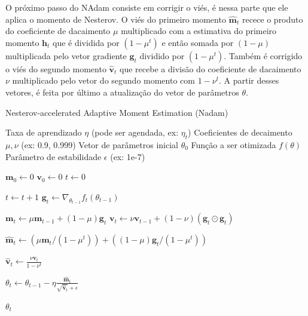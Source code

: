 O próximo passo do NAdam consiste em corrigir o viés, é nessa parte que ele aplica o momento de Nesterov. O viés do primeiro momento $\mathbf{\hat{m}}_t$ recece o produto do coeficiente de dacaimento $\mu$ multiplicado com a estimativa do primeiro momento $\mathbf{h}_t$ que é dividida por $(1 - \mu^t)$ e então somada por $(1 - \mu)$ multiplicada pelo vetor gradiente $\mathbf{g}_t$ dividido por $(1 - \mu^t)$. Também é corrigido o viés do segundo momento $\mathbf{\hat{v}}_t$ que recebe a divisão do coeficiente de dacaimento $\nu$ multiplicado pelo vetor do segundo momento com $1 - \nu^t$. A partir desses vetores, é feita por último a atualização do vetor de parâmetros $\theta$.

\begin{algorithm}[H]
    \caption{Nesterov-accelerated Adaptive Moment Estimation (Nadam)}
    \label{alg:nadam-estilizado}
    \begin{algorithmic}[1]

    \Require Taxa de aprendizado $\eta$ (pode ser agendada, ex: $\eta_t$)
    \Require Coeficientes de decaimento $\mu, \nu$ (ex: 0.9, 0.999)
    \Require Vetor de parâmetros inicial $\theta_0$
    \Require Função a ser otimizada $f(\theta)$
    \Require Parâmetro de estabilidade $\epsilon$ (ex: 1e-7)

    \State $\mathbf{m}_0 \leftarrow 0$ 
    \State $\mathbf{v}_0 \leftarrow 0$ 
    \State $t \leftarrow 0$ 

        \State $t \leftarrow t + 1$
        \State $\mathbf{g}_t \leftarrow \nabla_{\theta_{t-1}} f_t(\theta_{t-1})$
        
        \State $\mathbf{m}_t \leftarrow \mu \mathbf{m}_{t-1} + (1 - \mu) \mathbf{g}_t$
        \State $\mathbf{v}_t \leftarrow \nu \mathbf{v}_{t-1} + (1 - \nu) (\mathbf{g}_t \odot \mathbf{g}_t)$
        
        \State $\mathbf{\hat{m}}_t \leftarrow (\mu \mathbf{m}_t / (1 - \mu^t)) + ((1 - \mu) \mathbf{g}_t / (1 - \mu^t))$
        
        \State $\mathbf{\hat{v}}_t \leftarrow \frac{\nu \mathbf{v}_t}{1 - \nu^t}$
        
        \State $\theta_t \leftarrow \theta_{t-1} - \eta \frac{\mathbf{\hat{m}}_t}{\sqrt{\mathbf{\hat{v}}_t} + \epsilon}$
    \EndWhile

    \State \Return $\theta_t$ 
    \end{algorithmic}
\end{algorithm}


